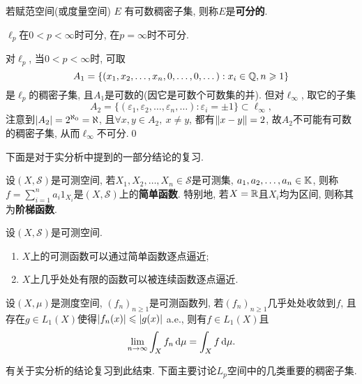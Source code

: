 	\begin{Definition}[可分性]
	若赋范空间(或度量空间) $ E $ 有可数稠密子集, 则称$ E $是\textbf{可分的}.
	\end{Definition}

	\begin{Proposition}
	$ \ell_p $在$ 0<p<\infty $时可分, 在$ p=\infty $时不可分.
	\end{Proposition}
	\begin{Proof}
	对$ \ell_p $, 当$ 0<p<\infty $时, 可取
	\[
	A_1=\{ (x_1,x_2, \dots,x_n,0, \dots,0, \dots) : x_i\in\mathbb{Q}, n\geqslant 1 \}
	\]
	是$ \ell_p $的稠密子集, 且$ A_1 $是可数的(因它是可数个可数集的并). 但对$ \ell_\infty $, 取它的子集
	\[
	A_2=\{ (\varepsilon_1,\varepsilon_2, \dots,\varepsilon_n, \dots) : \varepsilon_i=\pm 1 \}\subset\ell_\infty,
	\]
	注意到$ \left| A_2 \right| =2^{\aleph_0}=\aleph $, 且$ \forall x,y\in A_2,\ x\ne y $, 都有$ \left\| x-y \right\|=2 $, 故$ A_2 $不可能有可数的稠密子集, 从而$ \ell_\infty $不可分.\qed
	\end{Proof}

	下面是对于实分析中提到的一部分结论的复习.

	\begin{Definition}[简单函数]
	设$ (X,\mathcal S) $是可测空间, 若$ X_1,X_2, \dots,X_n\in\mathcal S $是可测集, $ a_1,a_2, \dots,a_n\in\mathbb{K} $, 则称$ f=\sum\limits_{i=1}^na_i1_{X_i} $是$ (X,\mathcal S) $上的\textbf{简单函数}. 特别地, 若$ X=\mathbb{R} $且$ X_i $均为区间, 则称其为\textbf{阶梯函数}.
	\end{Definition}

	\begin{Proposition}
	设$ (X,\mathcal S) $是可测空间.
	\begin{enumerate}[(1)]
	\item $ X $上的可测函数可以通过简单函数逐点逼近;
	\item $ X $上几乎处处有限的函数可以被连续函数逐点逼近.
	\end{enumerate}
	\end{Proposition}

	\begin{Theorem}[Lebesgue控制收敛定理]
	设$ (X,\mu) $是测度空间, $ (f_n)_{n\geqslant 1} $是可测函数列, 若$ (f_n)_{n\geqslant 1} $几乎处处收敛到$ f $, 且存在$ g\in L_1(X) $使得$ \left| f_n(x) \right| \leqslant\left| g(x) \right|  $ a.e., 则有$ f\in L_1(X) $且
	\[
	\lim_{n\to\infty}\int_Xf_n\,\mathrm{d}\mu=\int_Xf\,\mathrm{d}\mu.
	\]
	\end{Theorem}

	有关于实分析的结论复习到此结束. 下面主要讨论$ L_p $空间中的几类重要的稠密子集.

